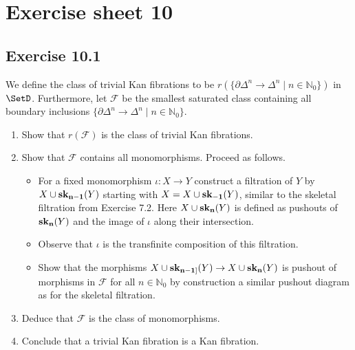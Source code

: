 \section{ Exercise sheet 10 }

\subsection{Exercise 10.1}

We define the class of trivial Kan fibrations to be $ r ( \{ \partial \Delta^n \to \Delta^n \mid n \in \mathbb{ N }_0 \} ) $ in $ \SetD $.
Furthermore, let $ \mathcal{ F } $ be the smallest saturated class containing all boundary inclusions $ \{ \partial \Delta^n \to \Delta^n \mid n \in \mathbb{ N }_0 \} $.

\begin{enumerate}[label=(\alph*)]
    \item 
    Show that $ r ( \mathcal{ F } ) $ is the class of trivial Kan fibrations.

    \item 
    Show that $ \mathcal{ F } $ contains all monomorphisms. Proceed as follows.

    \begin{itemize}
        \item 
        For a fixed monomorphism $ \iota : X \to Y $ construct a filtration of $ Y $ by $ X \cup \bold{sk_{n-1}} ( Y ) $ starting with $ X = X \cup \bold{sk_{-1}}( Y ) $, similar to the skeletal filtration from Exercise 7.2. 
        Here $ X \cup \bold{sk_n} ( Y ) $ is defined as pushouts of $ \bold{ sk_n } ( Y ) $ and the image of $ \iota $ along their intersection.

        \item 
        Observe that $ \iota $ is the transfinite composition of this filtration.

        \item 
        Show that the morphisms $ X \cup \bold{sk_{n-1]}}( Y ) \to X \cup \bold{ sk_n }( Y ) $ is pushout of morphisms in $ \mathcal{ F } $ for all $ n \in \mathbb{ N }_0 $ by construction a similar pushout diagram as for the skeletal filtration.
    \end{itemize}

    \item 
    Deduce that $\mathcal{ F }$ is the class of monomorphisms.

    \item 
    Conclude that a trivial Kan fibration is a Kan fibration.
    
\end{enumerate}

